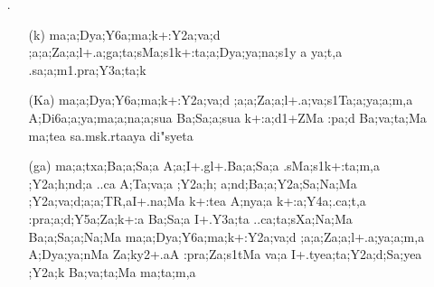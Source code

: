 \begin{spacing}{1.15}
\begin{itemize}
\begin{itemize}
      \item[({\sktf Ka}).] {\sktf Za;a;s1:t4i6a;a;ya;gr4a;nTa;a;Dya;ya;na;a;TR%
2a .sMa;pra;Y3a;ta ;Y2a;va:(;a;Y2a;va;d;a;a;l+.ya%
\ZF{-}.sMa;s1k+:ta;pa;a;F+.na\ZF{-}k+:mea ya;a
v.ya;va.s1Ta;a va;tRa;tea\ZF{,} .sa;a :pa;ya;Ra;p1a;a I+.Y3a;ta Ba;va;ntaH
ma;nya;ntea ;Y2a;k+:m,a ma;h;a;Y2a;va;d;a;a;l+.yea;Sua
;Y2a;va:(;a;Y2a;va;d;a;a;l+.yea;Sua ..ca
I+.d1+Za;Ma gr4a;nTa;a;na;a;m,a A;Dya;a:pa;nMa :pra;Ba;Y2a;va;SNua Ba;vea;t,a\ZF{,} I+.tyea;ta;d;TeRa
k+:a;d+Zi6a;a
;Y2a;va;Dea;ya;pa;d;vi6a;a Ba;va;Y5a;;d2H
.sUa;.cyea;ta}
               \end{itemize}

\item[{\sktf 13}.] \begin{itemize}
    \item[({\sktf k})] {\sktf ma;a;Dya;Y6a;ma;k+:Y2a;va;d%
;a;a;Za;a;l+.a;ga;ta;sMa;s1k+:ta;a;Dya;ya;na;s1y%
a ya;t,a .sa;a;m1.pra;Y3a;ta;k}

     \item[({\sktf Ka})] {\sktf ma;a;Dya;Y6a;ma;k+:Y2a;va;d%
;a;a;Za;a;l+.a;va;s1Ta;a;ya;a;m,a A;Di6a;a;ya;ma;a;na;a;sua
Ba;Sa;a;sua k+:a;d1+ZMa :pa;d Ba;va;ta;Ma ma;tea} {\sktf sa.msk.rtaaya di"syeta }
            
            \item[({\sktf ga})] {\sktf ma;a;txa;Ba;a;Sa;a\ZF{,}
A;a;I+.gl+.Ba;a;Sa;a\ZF{,} .sMa;s1k+:ta;m,a\ZF{,}
;Y2a;h;nd;a ..ca \ZF{(}A;Ta;va;a\ZF{,} ;Y2a;h;%
a;nd;Ba;a;Y2a;Sa;Na;Ma ;Y2a;va;d;a;a;TR,aI+.na;Ma k+:tea A;nya;a k+:a;Y4a;.ca;t,a
:pra;a;d;Y5a;Za;k+:a Ba;Sa;a\ZF{),} I+.Y3a;ta
..ca;ta;sXa;Na;Ma Ba;a;Sa;a;Na;Ma ma;a;Dya;Y6a;ma;k+:Y2a;va;d%
;a;a;Za;a;l+.a;ya;a;m,a A;Dya;ya;nMa Za;ky2+.aA :pra;Za;s1tMa va;a\ZF{,} I+.tyea;ta;Y2a;d;Sa;yea
;Y2a;k Ba;va;ta;Ma ma;ta;m,a}
            

\end{itemize}
\end{itemize}
\end{spacing}
